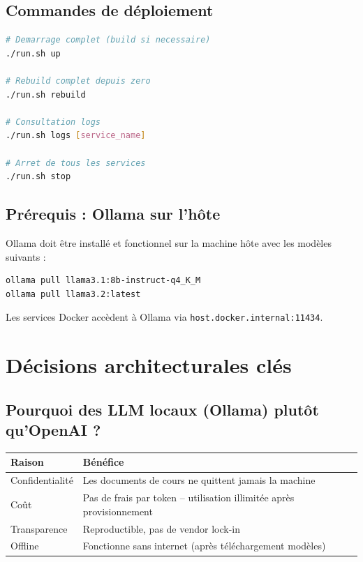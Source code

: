 \documentclass[12pt,a4paper]{article}
\begin{document}
\subsection{Commandes de déploiement}

\begin{lstlisting}[language=bash]
# Demarrage complet (build si necessaire)
./run.sh up

# Rebuild complet depuis zero
./run.sh rebuild

# Consultation logs
./run.sh logs [service_name]

# Arret de tous les services
./run.sh stop
\end{lstlisting}

\subsection{Prérequis : Ollama sur l'hôte}

Ollama doit être installé et fonctionnel sur la machine hôte avec les modèles suivants :

\begin{lstlisting}[language=bash]
ollama pull llama3.1:8b-instruct-q4_K_M
ollama pull llama3.2:latest
\end{lstlisting}

Les services Docker accèdent à Ollama via \texttt{host.docker.internal:11434}.

\section{Décisions architecturales clés}

\subsection{Pourquoi des LLM locaux (Ollama) plutôt qu'OpenAI ?}

\begin{table}[H]
    \centering
    \begin{tabularx}{\textwidth}{@{}lX@{}}
        \toprule
        \textbf{Raison} & \textbf{Bénéfice} \\
        \midrule
        Confidentialité & Les documents de cours ne quittent jamais la machine \\
        Coût & Pas de frais par token -- utilisation illimitée après provisionnement \\
        Transparence & Reproductible, pas de vendor lock-in \\
        Offline & Fonctionne sans internet (après téléchargement modèles) \\
        \bottomrule
    \end{tabularx}
\end{table}
\end{document}
